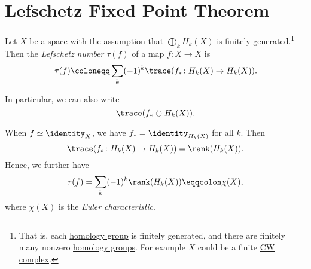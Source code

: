 \section{Lefschetz Fixed Point Theorem}
\begin{definition}\label{def:Lefschetz-number}
	Let \(X\) be a space with the assumption that \(\bigoplus_k H_k(X)\) is finitely generated.\footnote{That is, each \hyperref[def:homology-group]{homology group}
		is finitely	generated, and there are finitely many nonzero \hyperref[def:homology-group]{homology groups}.
		For example \(X\) could be a finite \hyperref[def:CW-Complex]{CW complex}.}
	Then the \emph{Lefschetz number} \(\tau(f)\) of a map \(f \colon X \to X\) is
	\[
		\tau(f) \coloneqq \sum_k (-1)^k \trace(f_\ast \colon H_k(X) \to H_k(X)).
	\]
\end{definition}
\begin{remark}
	In particular, we can also write
	\[
		\trace(f_{\ast} \circlearrowright H_{k} (X)).
	\]
\end{remark}

\begin{eg}
	When \(f \simeq \identity _X\), we have \(f_\ast = \identity_{H_k(X)}\) for all \(k\).
	Then
	\[
		\trace(f_\ast \colon H_k(X) \to H_k(X)) = \rank(H_k(X)).
	\]
	Hence, we further have
	\[
		\tau(f) = \sum_k (-1)^k\rank(H_k(X)) \eqqcolon \chi(X),
	\]
	where \(\chi(X)\) is the \emph{Euler characteristic}.
\end{eg}

